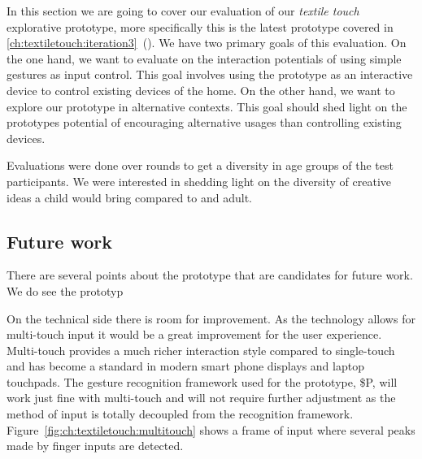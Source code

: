 In this section we are going to cover our evaluation of our \emph{textile touch} explorative prototype, more specifically this is the latest prototype covered in \ref{ch:textiletouch:iteration3}~().
We have two primary goals of this evaluation.
On the one hand, we want to evaluate on the interaction potentials of using simple gestures as input control.
This goal involves using the prototype as an interactive device to control existing devices of the home.
On the other hand, we want to explore our prototype in alternative contexts.
This goal should shed light on the prototypes potential of encouraging alternative usages than controlling existing devices.

Evaluations were done over  rounds to get a diversity in age groups of the test participants.
We were interested in shedding light on the diversity of creative ideas a child would bring compared to and adult.



\subsection{Future work}
\label{ch:textiletouch:futurework}

There are several points about the prototype that are candidates for future work.
We do see the prototyp

On the technical side there is room for improvement.
As the technology allows for multi-touch input it would be a great improvement for the user experience.
Multi-touch provides a much richer interaction style  compared to single-touch and has become a standard in modern smart phone displays and laptop touchpads.
The gesture recognition framework used for the prototype, \$P, will work just fine with multi-touch and will not require further adjustment as the method of input is totally decoupled from the recognition framework. 
Figure~\ref{fig:ch:textiletouch:multitouch} shows a frame of input where several peaks made by finger inputs are detected. 

